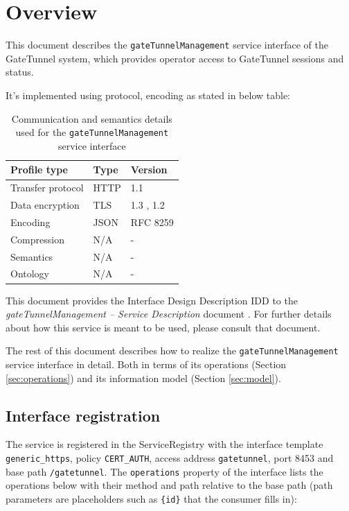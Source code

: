 \documentclass[a4paper]{arrowhead}
\begin{document}
\section{Overview}
\label{sec:overview}

This document describes the \texttt{gate\allowbreak{}Tunnel\allowbreak{}Management} service interface of the GateTunnel system, which provides operator access to GateTunnel sessions and status.

It's implemented using protocol, encoding as stated in below table:
\begin{table}[ht!]
  \centering
  \begin{tabular}{|l|l|l|}
    \hline
    \rowcolor{gray!33} Profile type & Type & Version \\ \hline
    Transfer protocol & HTTP & 1.1 \cite{rfc9112} \\ \hline
    Data encryption & TLS & 1.3 \cite{rfc8446}, 1.2 \cite{rfc5246} \\ \hline
    Encoding & JSON & RFC 8259 \cite{rfc8259} \\ \hline
    Compression & N/A & - \\ \hline
    Semantics & N/A & - \\ \hline
    Ontology & N/A & - \\ \hline
  \end{tabular}
  \caption{Communication and semantics details used for the \texttt{gate\allowbreak{}Tunnel\allowbreak{}Management} service interface}
  \label{tab:comunication_semantics_profile}
\end{table}

This document provides the Interface Design Description IDD to the \textit{gateTunnelManagement -- Service Description} document \cite{gt-gateTunnelManagement-sd}.
For further details about how this service is meant to be used, please consult that document.

The rest of this document describes how to realize the \texttt{gate\allowbreak{}Tunnel\allowbreak{}Management} service
interface in detail. Both in terms of its operations (Section \ref{sec:operations}) and its information model (Section \ref{sec:model}).

\subsection{Interface registration}

The service is registered in the ServiceRegistry with the interface template \texttt{generic\_\allowbreak{}https}, policy \texttt{CERT\_\allowbreak{}AUTH}, access address \texttt{gatetunnel}, port 8453 and base path \texttt{/\allowbreak{}gatetunnel}. The \texttt{operations} property of the interface lists the operations below with their method and path relative to the base path (path parameters are placeholders such as \texttt{\{id\}} that the consumer fills in):
\end{document}
